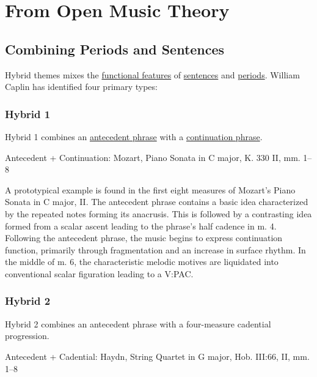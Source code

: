 \documentclass{book}
\begin{document}
\hypertarget{from-open-music-theory-27}{%
\section{From Open Music Theory}\label{from-open-music-theory-27}}

\hypertarget{combining-periods-and-sentences}{%
\subsection{Combining Periods and
Sentences}\label{combining-periods-and-sentences}}

Hybrid themes mixes the \href{themeFunctions.html}{functional features} of
\href{sentence.html}{sentences} and \href{period.html}{periods}. William
Caplin has identified four primary types:

\hypertarget{hybrid-1}{%
\subsubsection{Hybrid 1}\label{hybrid-1}}

Hybrid 1 combines an \href{themeFunctions.html\#antecedent}{antecedent phrase}
with a \href{themeFunctions.html\#continuation}{continuation phrase}.

Antecedent + Continuation: Mozart, Piano Sonata in C major, K. 330 II, mm.
1--8

A prototypical example is found in the first eight measures of Mozart's Piano
Sonata in C major, II. The antecedent phrase contains a basic idea
characterized by the repeated notes forming its anacrusis. This is followed by
a contrasting idea formed from a scalar ascent leading to the phrase's half
cadence in m. 4. Following the antecedent phrase, the music begins to express
continuation function, primarily through fragmentation and an increase in
surface rhythm. In the middle of m. 6, the characteristic melodic motives are
liquidated into conventional scalar figuration leading to a V:PAC.

\hypertarget{hybrid-2}{%
\subsubsection{Hybrid 2}\label{hybrid-2}}

Hybrid 2 combines an antecedent phrase with a four-measure cadential
progression.

Antecedent + Cadential: Haydn, String Quartet in G major, Hob. III:66, II, mm.
1--8
\end{document}
